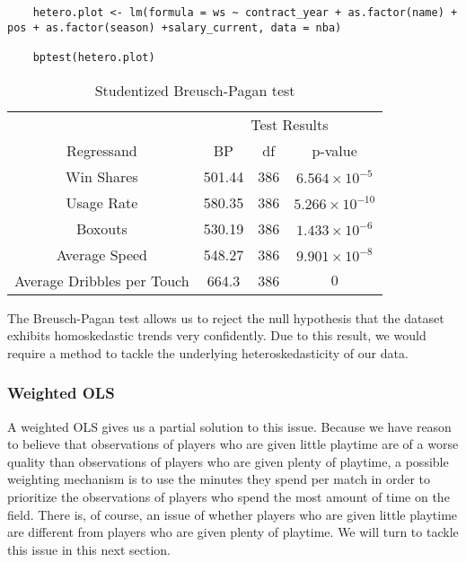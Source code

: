\documentclass[12pt]{article}
\begin{document}
	
	\begin{lstlisting}
	hetero.plot <- lm(formula = ws ~ contract_year + as.factor(name) + pos + as.factor(season) +salary_current, data = nba)
	
	bptest(hetero.plot)
	\end{lstlisting}
	
	\begin{table}[H]
		\centering
		\caption{Studentized Breusch-Pagan test}
		\begin{tabular}{*4c}
			\toprule
			& \multicolumn{3}{c}{Test Results} \\
			\cmidrule(lr){2-4}
			Regressand & BP  & df & p-value \\
			\midrule
			Win Shares & 501.44       & 386 & $6.564\times 10^{-5}$       \\
			Usage Rate & 580.35       & 386       & $5.266\times10^{-10}$ \\
			Boxouts & 530.19       & 386 & $1.433\times10^{-6}$ \\
			Average Speed & 548.27 & 386       & $9.901\times 10^{-8}$       \\
			Average Dribbles per Touch & 664.3  & 386 & $0$        \\
			\bottomrule
		\end{tabular}
	\end{table}

	The Breusch-Pagan test allows us to reject the null hypothesis that the dataset exhibits homoskedastic trends very confidently. Due to this result, we would require a method to tackle the underlying heteroskedasticity of our data.

	\subsubsection{Weighted OLS}
	
	A weighted OLS gives us a partial solution to this issue. Because we have reason to believe that observations of players who are given little playtime are of a worse quality than observations of players who are given plenty of playtime, a possible weighting mechanism is to use the minutes they spend per match in order to prioritize the observations of players who spend the most amount of time on the field. There is, of course, an issue of whether players who are given little playtime are different from players who are given plenty of playtime. We will turn to tackle this issue in this next section.
	
\end{document}

